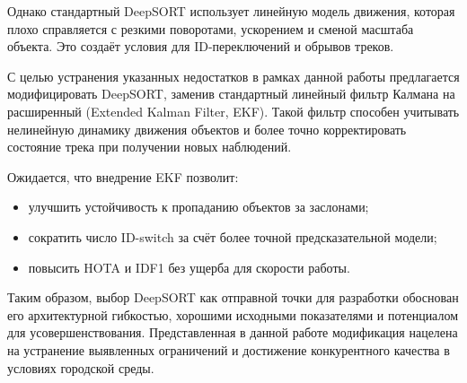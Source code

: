 Однако стандартный DeepSORT использует линейную модель движения, которая плохо справляется с резкими поворотами, ускорением и сменой масштаба объекта. Это создаёт условия для ID-переключений и обрывов треков.

С целью устранения указанных недостатков в рамках данной работы предлагается модифицировать DeepSORT, заменив стандартный линейный фильтр Калмана на расширенный (Extended Kalman Filter, EKF). Такой фильтр способен учитывать нелинейную динамику движения объектов и более точно корректировать состояние трека при получении новых наблюдений.

Ожидается, что внедрение EKF позволит:
\begin{itemize}
    \item улучшить устойчивость к пропаданию объектов за заслонами;
    \item сократить число ID-switch за счёт более точной предсказательной модели;
    \item повысить HOTA и IDF1 без ущерба для скорости работы.
\end{itemize}

Таким образом, выбор DeepSORT как отправной точки для разработки обоснован его архитектурной гибкостью, хорошими исходными показателями и потенциалом для усовершенствования. Представленная в данной работе модификация нацелена на устранение выявленных ограничений и достижение конкурентного качества в условиях городской среды.

